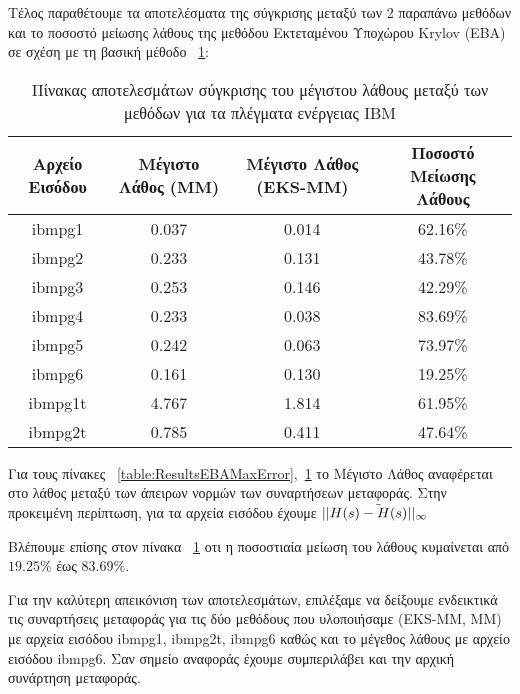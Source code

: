 Τέλος παραθέτουμε τα αποτελέσματα της σύγκρισης μεταξύ των 2 παραπάνω μεθόδων και το ποσοστό μείωσης λάθους της μεθόδου Εκτεταμένου Υποχώρου \textlatin{Krylov} (\textlatin{EBA}) σε σχέση με τη βασική μέθοδο ~\ref{table:ResultsEBAMaxErrorCompared}:

\begin{table}[h!]
\centering
\begin{adjustbox}{width=1\textwidth}
 \begin{tabular}{||c | c | c | c||} 
 \hline
 Αρχείο Εισόδου & Μέγιστο Λάθος (\textlatin{MM}) & Μέγιστο Λάθος (\textlatin{EKS-MM}) & Ποσοστό Μείωσης Λάθους \\ [0.8ex] 
 \hline\hline
 \textlatin{ibmpg1} & 0.037  & 0.014 & 62.16\% \\ 
 \hline
 \textlatin{ibmpg2} & 0.233 & 0.131 & 43.78\% \\
 \hline
 \textlatin{ibmpg3} & 0.253 & 0.146 & 42.29\% \\
 \hline
 \textlatin{ibmpg4} & 0.233 & 0.038 & 83.69\% \\
 \hline
 \textlatin{ibmpg5} & 0.242 & 0.063 & 73.97\% \\
 \hline
 \textlatin{ibmpg6} & 0.161 & 0.130 & 19.25\% \\
 \hline
 \textlatin{ibmpg1t} & 4.767 &  1.814 & 61.95\% \\
 \hline
 \textlatin{ibmpg2t} & 0.785 &  0.411 & 47.64\% \\
 \hline
\end{tabular}
\end{adjustbox}
\caption{Πίνακας αποτελεσμάτων σύγκρισης του μέγιστου λάθους μεταξύ των μεθόδων για τα πλέγματα ενέργειας \textlatin{IBM}}
\label{table:ResultsEBAMaxErrorCompared}
\end{table}

Για τους πίνακες ~\ref{table:ResultsEBAMaxError},~\ref{table:ResultsEBAMaxErrorCompared} το Μέγιστο Λάθος αναφέρεται στο λάθος μεταξύ των άπειρων νορμών των συναρτήσεων μεταφοράς. Στην προκειμένη περίπτωση, για τα αρχεία εισόδου έχουμε $|| \Tilde{H(s) - H(s)||_\infty}$


Βλέπουμε επίσης στον πίνακα ~\ref{table:ResultsEBAMaxErrorCompared} οτι η ποσοστιαία μείωση του λάθους κυμαίνεται από $19.25\%$ έως $83.69\%$.

Για την καλύτερη απεικόνιση των αποτελεσμάτων, επιλέξαμε να δείξουμε ενδεικτικά τις συναρτήσεις μεταφοράς για τις δύο μεθόδους που υλοποιήσαμε (\textlatin{EKS-MM, MM}) με αρχεία εισόδου \textlatin{ibmpg1, ibmpg2t, ibmpg6} καθώς και το μέγεθος λάθους με αρχείο εισόδου \textlatin{ibmpg6}. Σαν σημείο αναφοράς έχουμε συμπεριλάβει και την αρχική συνάρτηση μεταφοράς.


